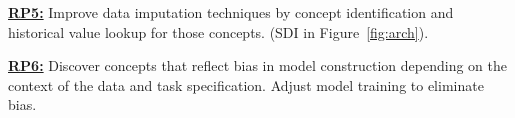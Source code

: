 \documentclass[sigconf, nonacm]{acmart}
\newcommand{\topic}[1]{\noindent \underline{ \bf #1}}
\begin{document}
\topic{RP5:} Improve data imputation techniques by concept identification and historical value lookup for those concepts. (SDI in Figure~\ref{fig:arch}).

\topic{RP6:} Discover concepts that reflect bias in model construction depending on the context of the data and task specification. Adjust model training to eliminate bias.



%



\end{document}
